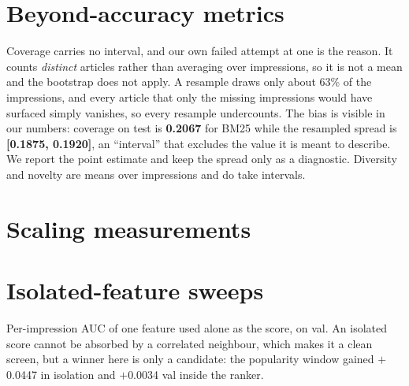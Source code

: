 \section{Beyond-accuracy metrics}
\label{app:beyond}

\begin{table}[t]
\centering\footnotesize

\caption{Top-10 beyond-accuracy metrics, test split. Diversity is the share of top-10 pairs from
different categories; novelty is mean self-information in bits, so higher is less obvious;
coverage is the share of the catalogue that ever reaches a top 10.}
\end{table}

Coverage carries no interval, and our own failed attempt at one is the reason. It counts
\emph{distinct} articles rather than averaging over impressions, so it is not a mean and the
bootstrap does not apply. A resample draws only about 63\% of the impressions, and every article
that only the missing impressions would have surfaced simply vanishes, so every resample
undercounts. The bias is visible in our numbers: coverage on \eb{} test is \textbf{0.2067} for BM25
while the resampled spread is \textbf{[0.1875, 0.1920]}, an ``interval'' that excludes the value it
is meant to describe. We report the point estimate and keep the spread only as a diagnostic.
Diversity and novelty are means over impressions and do take intervals.

\section{Scaling measurements}
\label{app:scaling}

\begin{table}[t]
\centering\small

\caption{Latency against corpus size in milliseconds, the numbers behind
Figure~\ref{fig:scaling}. Same machine and same model throughout.}
\end{table}

\section{Isolated-feature sweeps}
\label{app:sweeps}

Per-impression AUC of one feature used alone as the score, on val. An isolated score cannot be
absorbed by a correlated neighbour, which makes it a clean screen, but a winner here is only a
candidate: the popularity window gained $+$0.0447 in isolation and $+$0.0034 val inside the ranker.

